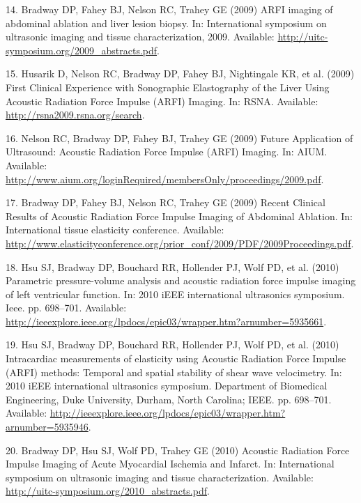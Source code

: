 \documentclass[letterpaper,10pt,english]{sphinxmanual}
\begin{document}
14. Bradway DP, Fahey BJ, Nelson RC, Trahey GE (2009) ARFI imaging of
abdominal ablation and liver lesion biopsy. In: International symposium
on ultrasonic imaging and tissue characterization, 2009. Available:
\href{http://uitc-symposium.org/2009\_abstracts.pdf}{http://uitc-symposium.org/2009\_abstracts.pdf}.

15. Husarik D, Nelson RC, Bradway DP, Fahey BJ, Nightingale KR, et al.
(2009) First Clinical Experience with Sonographic Elastography of the
Liver Using Acoustic Radiation Force Impulse (ARFI) Imaging. In: RSNA.
Available: \href{http://rsna2009.rsna.org/search}{http://rsna2009.rsna.org/search}.

16. Nelson RC, Bradway DP, Fahey BJ, Trahey GE (2009) Future Application
of Ultrasound: Acoustic Radiation Force Impulse (ARFI) Imaging. In:
AIUM. Available:
\href{http://www.aium.org/loginRequired/membersOnly/proceedings/2009.pdf}{http://www.aium.org/loginRequired/membersOnly/proceedings/2009.pdf}.

17. Bradway DP, Fahey BJ, Nelson RC, Trahey GE (2009) Recent Clinical
Results of Acoustic Radiation Force Impulse Imaging of Abdominal
Ablation. In: International tissue elasticity conference. Available:
\href{http://www.elasticityconference.org/prior\_conf/2009/PDF/2009Proceedings.pdf}{http://www.elasticityconference.org/prior\_conf/2009/PDF/2009Proceedings.pdf}.

18. Hsu SJ, Bradway DP, Bouchard RR, Hollender PJ, Wolf PD, et al.
(2010) Parametric pressure-volume analysis and acoustic radiation force
impulse imaging of left ventricular function. In: 2010 iEEE
international ultrasonics symposium. Ieee. pp. 698–701. Available:
\href{http://ieeexplore.ieee.org/lpdocs/epic03/wrapper.htm?arnumber=5935661}{http://ieeexplore.ieee.org/lpdocs/epic03/wrapper.htm?arnumber=5935661}.

19. Hsu SJ, Bradway DP, Bouchard RR, Hollender PJ, Wolf PD, et al.
(2010) Intracardiac measurements of elasticity using Acoustic Radiation
Force Impulse (ARFI) methods: Temporal and spatial stability of shear
wave velocimetry. In: 2010 iEEE international ultrasonics symposium.
Department of Biomedical Engineering, Duke University, Durham, North
Carolina; IEEE. pp. 698–701. Available:
\href{http://ieeexplore.ieee.org/lpdocs/epic03/wrapper.htm?arnumber=5935946}{http://ieeexplore.ieee.org/lpdocs/epic03/wrapper.htm?arnumber=5935946}.

20. Bradway DP, Hsu SJ, Wolf PD, Trahey GE (2010) Acoustic Radiation
Force Impulse Imaging of Acute Myocardial Ischemia and Infarct. In:
International symposium on ultrasonic imaging and tissue
characterization. Available:
\href{http://uitc-symposium.org/2010\_abstracts.pdf}{http://uitc-symposium.org/2010\_abstracts.pdf}.
\end{document}
